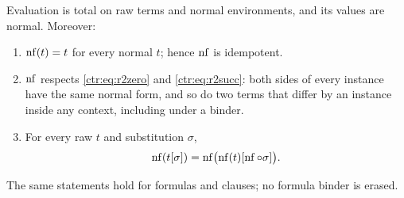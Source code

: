 \begin{lemma}\label{ctr:lem:nf}
Evaluation is total on raw terms and normal environments, and its values are normal.
Moreover:
\begin{enumerate}
\item $\operatorname{nf}(t)=t$ for every normal $t$; hence $\operatorname{nf}$ is idempotent.
\item $\operatorname{nf}$ respects \eqref{ctr:eq:r2zero} and \eqref{ctr:eq:r2succ}: both sides of every
instance have the same normal form, and so do two terms that differ by an instance inside
any context, including under a binder.
\item For every raw $t$ and substitution $\sigma$,
\begin{equation}\label{ctr:eq:SC}
 \operatorname{nf}(t[\sigma])=\operatorname{nf}\bigl(\operatorname{nf}(t)[\operatorname{nf}\circ\sigma]\bigr).
\end{equation}
\end{enumerate}
The same statements hold for formulas and clauses; no formula binder is erased.
\end{lemma}
